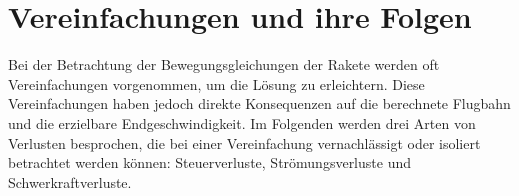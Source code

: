 %
%
%
%

\section{Vereinfachungen und ihre Folgen 
	\label{leo:section:vereinfachungen}}

Bei der Betrachtung der Bewegungsgleichungen der Rakete werden oft Vereinfachungen vorgenommen, um die Lösung zu erleichtern. Diese Vereinfachungen haben jedoch direkte Konsequenzen auf die berechnete Flugbahn und die erzielbare Endgeschwindigkeit. Im Folgenden werden drei Arten von Verlusten besprochen, die bei einer Vereinfachung vernachlässigt oder isoliert betrachtet werden können: Steuerverluste, Strömungsverluste und Schwerkraftverluste.

